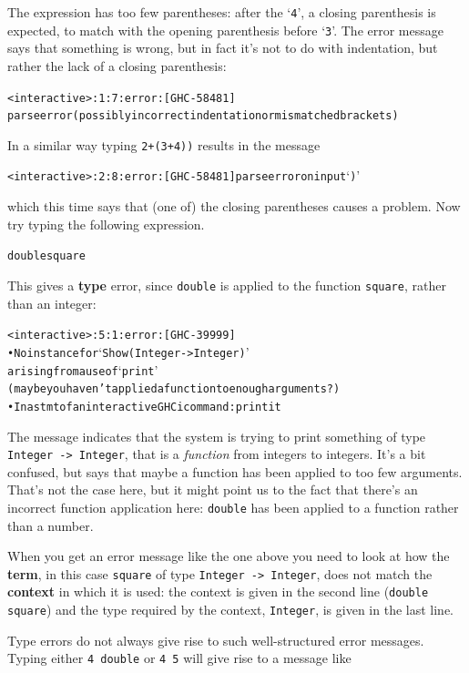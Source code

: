 The expression
has too few parentheses: after the `\texttt{4}', a closing parenthesis is expected, to match with the
opening parenthesis before `\texttt{3}'. The error message says that something is wrong, but in fact it's not to do with indentation, but rather the lack of a closing parenthesis:
\begin{alltt}
<interactive>:1:7: error: [GHC-58481]
    parse error (possibly incorrect indentation or mismatched brackets)\end{alltt}
In a similar way typing \texttt{2+(3+4))} results in the message
\begin{alltt}
<interactive>:2:8: error: [GHC-58481] parse error on input ‘)’
\end{alltt}
which this time says that (one of) the closing parentheses causes a problem. Now try typing the following expression. 
\begin{alltt}
double square
\end{alltt}
This gives a \textbf{type} error, since \texttt{double} is applied to the
function \texttt{square}, rather than an integer:
\begin{alltt}
<interactive>:5:1: error: [GHC-39999]
    • No instance for ‘Show (Integer -> Integer)’
        arising from a use of ‘print’
        (maybe you haven't applied a function to enough arguments?)
    • In a stmt of an interactive GHCi command: print it\end{alltt}
The message indicates that the system is trying to print something of type 
\texttt{Integer -> Integer}, that is a \emph{function} from integers to integers. It's a bit confused, but says that maybe a function has been applied to too few arguments. That's not the case here, but it might point us to the fact that there's an incorrect function application here: \texttt{double} has been applied to a function rather than a number.


When you get an error message like the one above you need to look
at how the \textbf{term},
in this case \texttt{square} of type \texttt{Integer -> Integer}, does not match the
\textbf{context} in 
which it is used: the context is given in the second line (\texttt{double square})
and the type required by the context, \texttt{Integer}, is given in the last line.

Type errors do not always give rise to
such well-structured error messages. Typing
either \texttt{4 double} or \texttt{4 5} will give rise to 
a message like


